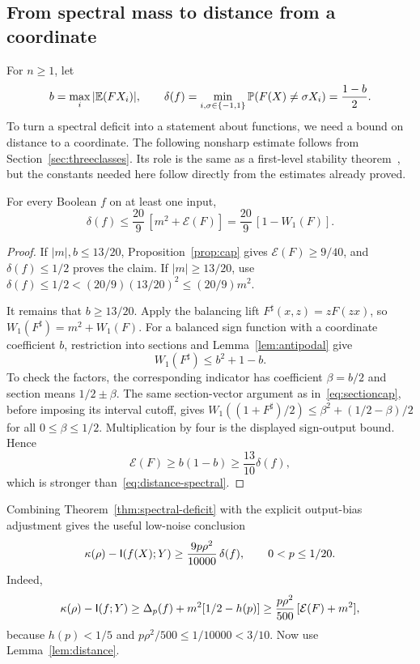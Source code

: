 \subsection{From spectral mass to distance from a coordinate}
For $n\ge1$, let
\[
b=\max_i|\mathbb E(FX_i)|,\qquad
\delta(f)=\min_{i,\sigma\in\{-1,1\}}\mathbb P(F(X)\ne\sigma X_i)
=\frac{1-b}{2}.
\]
To turn a spectral deficit into a statement about functions, we need a bound on distance to a coordinate. The following nonsharp estimate follows from Section~\ref{sec:threeclasses}. Its role is the same as a first-level stability theorem~\cite{FKN}, but the constants needed here follow directly from the estimates already proved.

\begin{lemma}\label{lem:distance}
For every Boolean $f$ on at least one input,
\begin{equation}\label{eq:distance-spectral}
\delta(f)\le\frac{20}{9}\,[m^2+\mathcal E(F)]
=\frac{20}{9}\,[1-W_1(F)].
\end{equation}
\end{lemma}
\begin{proof}
If $|m|,b\le13/20$, Proposition~\ref{prop:cap} gives $\mathcal E(F)\ge9/40$, and $\delta(f)\le1/2$ proves the claim. If $|m|\ge13/20$, use $\delta(f)\le1/2<(20/9)(13/20)^2\le(20/9)m^2$.

It remains that $b\ge13/20$. Apply the balancing lift $F^\sharp(x,z)=zF(zx)$, so $W_1(F^\sharp)=m^2+W_1(F)$. For a balanced sign function with a coordinate coefficient $b$, restriction into sections and Lemma~\ref{lem:antipodal} give
\[
W_1(F^\sharp)\le b^2+1-b.
\]
To check the factors, the corresponding indicator has coefficient $\beta=b/2$ and section means $1/2\pm\beta$. The same section-vector argument as in~\eqref{eq:sectioncap}, before imposing its interval cutoff, gives
$W_1((1+F^\sharp)/2)\le\beta^2+(1/2-\beta)/2$ for all $0\le\beta\le1/2$. Multiplication by four is the displayed sign-output bound. Hence
\[
\mathcal E(F)\ge b(1-b)\ge\frac{13}{10}\delta(f),
\]
which is stronger than~\eqref{eq:distance-spectral}.
\end{proof}

Combining Theorem~\ref{thm:spectral-deficit} with the explicit output-bias adjustment gives the useful low-noise conclusion
\begin{equation}\label{eq:low-stability}
\kappa(\rho)-\mathsf I(f(X);Y)
\ge\frac{9p\rho^2}{10000}\,\delta(f),
\qquad 0<p\le1/20.
\end{equation}
Indeed,
\[
\kappa(\rho)-\mathsf I(f;Y)
\ge\Delta_p(f)+m^2[1/2-h(p)]
\ge\frac{p\rho^2}{500}\,[\mathcal E(F)+m^2],
\]
because $h(p)<1/5$ and $p\rho^2/500\le1/10000<3/10$. Now use Lemma~\ref{lem:distance}.

